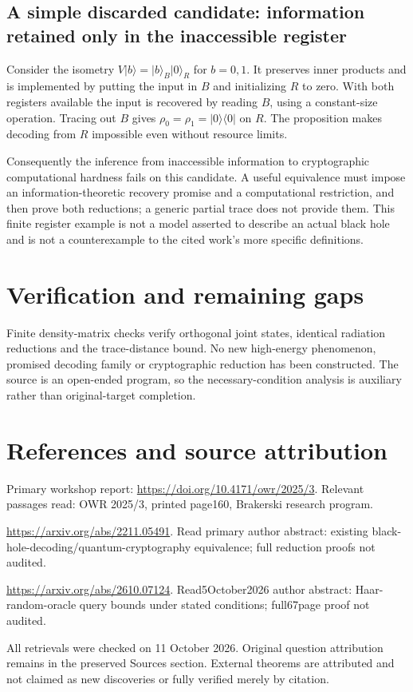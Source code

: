 \documentclass[11pt]{article}
\begin{document}
\subsection{A simple discarded candidate: information retained only in the inaccessible register}
Consider the isometry $V|b\rangle=|b\rangle_B|0\rangle_R$ for $b=0,1$. It preserves inner products and is implemented by putting the input in $B$ and initializing $R$ to zero. With both registers available the input is recovered by reading $B$, using a constant-size operation. Tracing out $B$ gives $\rho_0=\rho_1=|0\rangle\langle0|$ on $R$. The proposition makes decoding from $R$ impossible even without resource limits.

Consequently the inference from inaccessible information to cryptographic computational hardness fails on this candidate. A useful equivalence must impose an information-theoretic recovery promise and a computational restriction, and then prove both reductions; a generic partial trace does not provide them. This finite register example is not a model asserted to describe an actual black hole and is not a counterexample to the cited work's more specific definitions.
\section{Verification and remaining gaps}
Finite density-matrix checks verify orthogonal joint states, identical radiation reductions and the trace-distance bound. No new high-energy phenomenon, promised decoding family or cryptographic reduction has been constructed. The source is an open-ended program, so the necessary-condition analysis is auxiliary rather than original-target completion.

\section{References and source attribution}
Primary workshop report: \url{https://doi.org/10.4171/owr/2025/3}. Relevant passages read: OWR 2025/3, printed page160, Brakerski research program.

\url{https://arxiv.org/abs/2211.05491}. Read primary author abstract: existing black-hole-decoding/quantum-cryptography equivalence; full reduction proofs not audited.

\url{https://arxiv.org/abs/2610.07124}. Read5October2026 author abstract: Haar-random-oracle query bounds under stated conditions; full67page proof not audited.

All retrievals were checked on 11 October 2026. Original question attribution remains in the preserved Sources section. External theorems are attributed and not claimed as new discoveries or fully verified merely by citation.
\end{document}
